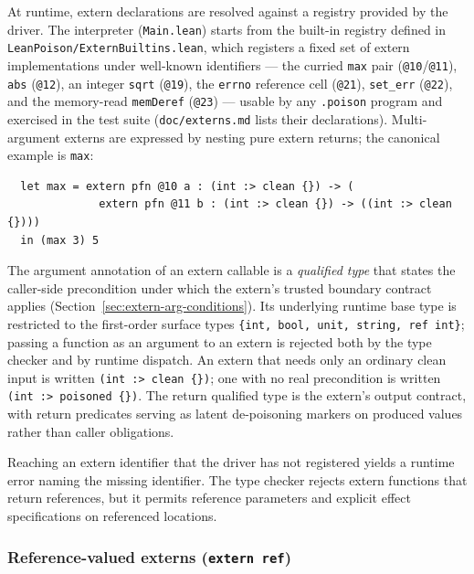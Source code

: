 \documentclass[12pt]{article}
\begin{document}
At runtime, extern declarations are resolved against a registry provided by
the driver.  The interpreter (\texttt{Main.lean}) starts from the built-in
registry defined in \texttt{LeanPoison/ExternBuiltins.lean}, which registers a
fixed set of extern implementations under well-known identifiers — the
curried \texttt{max} pair (\texttt{@10}/\texttt{@11}), \texttt{abs}
(\texttt{@12}), an integer \texttt{sqrt} (\texttt{@19}), the \texttt{errno}
reference cell (\texttt{@21}), \texttt{set\_err} (\texttt{@22}), and the
memory-read \texttt{memDeref} (\texttt{@23}) — usable by any \texttt{.poison}
program and exercised in the test suite (\texttt{doc/externs.md} lists their
declarations).  Multi-argument externs are expressed by nesting pure extern
returns; the canonical example is \texttt{max}:
\begin{verbatim}
  let max = extern pfn @10 a : (int :> clean {}) -> (
              extern pfn @11 b : (int :> clean {}) -> ((int :> clean {})))
  in (max 3) 5
\end{verbatim}

The argument annotation of an extern callable is a \emph{qualified type} that
states the caller-side precondition under which the extern's trusted boundary
contract applies (Section~\ref{sec:extern-arg-conditions}). Its underlying
runtime base type is restricted to the first-order surface types
\texttt{\{int, bool, unit, string, ref int\}}; passing a function as an argument
to an extern is rejected both by the type checker and by runtime dispatch. An
extern that needs only an ordinary clean input is written \texttt{(int :> clean
\{\})}; one with no real precondition is written \texttt{(int :> poisoned
\{\})}. The return qualified type is the extern's output
contract, with return predicates serving as latent de-poisoning markers on
produced values rather than caller obligations.

Reaching an extern identifier that the driver has not registered yields a
runtime error naming the missing identifier.  The type checker rejects
extern functions that return references, but it permits reference parameters
and explicit effect specifications on referenced locations.

\subsubsection*{Reference-valued externs (\texttt{extern ref})}
\label{sec:extern-ref}
\end{document}
